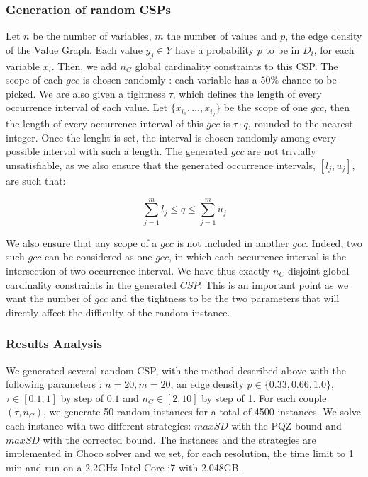 \documentclass[jair,twoside,11pt,theapa]{article}
\begin{document}
\subsubsection{Generation of random CSPs}

Let $n$ be the number of variables, $m$ the number of values and $p$, the edge density of the Value Graph. Each value $y_j \in Y$ have a probability $p$ to be in $D_i$, for each variable $x_i$. Then, we add $n_C$ global cardinality constraints to this CSP. 
The scope of each $gcc$ is chosen randomly : each variable has a $50\%$ chance to be picked. We are also given a tightness $\tau$, which defines the length of every occurrence interval of each value. Let $\lbrace x_{i_1}, \ldots, x_{i_q}\rbrace$ be the scope of one $gcc$, then the length of every occurrence interval of this $gcc$ is $\tau \cdot q$, rounded to the nearest integer. Once the lenght is set, the interval is chosen randomly among every possible interval with such a length. The generated $gcc$ are not trivially unsatisfiable, as we also ensure that the generated occurrence intervals, $[l_j, u_j]$, are such that:

\begin{equation*}
	\sum_{j=1}^m l_j \leq q \leq \sum_{j=1}^m u_j
\end{equation*}

We also ensure that any scope of a $gcc$ is not included in another $gcc$. Indeed, two such $gcc$ can be considered as one $gcc$, in which each occurrence interval is the intersection of two occurrence interval. We have thus exactly $n_C$ disjoint global cardinality constraints in the generated $CSP$. This is an important point as we want the number of $gcc$ and the tightness to be the two parameters that will directly affect the difficulty of the random instance.



\subsubsection{Results Analysis}

We generated several random CSP, with the method described above with the following parameters : $n=20, m=20$, an edge density $p \in \lbrace 0.33, 0.66, 1.0\rbrace$, $\tau \in [0.1,1]$ by step of $0.1$ and $n_C \in [2,10]$ by step of 1. For each couple $(\tau, n_C)$, we generate 50 random instances for a total of 4500 instances. We solve each instance with two different strategies: $maxSD$ with the PQZ bound and $maxSD$ with the corrected bound. The instances and the strategies are implemented in Choco solver \cite{chocoSolver} and we set, for each resolution, the time limit to 1 min and run on a 2.2GHz Intel Core i7 with 2.048GB.
\end{document}
